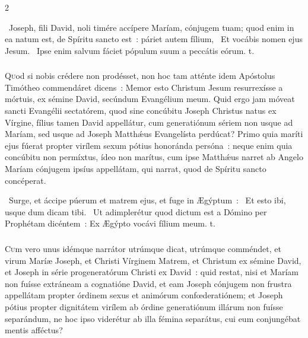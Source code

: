 \documentclass[9pt,twoside]{extarticle}
\begin{document}
\begin{multicols}{2}
{\begin{tightlist}{}
\item {}~Joseph, fili David, noli timére accípere Maríam, cónjugem tuam; quod enim in ea natum est, de Spíritu sancto est~: páriet autem fílium, \textred{*}~Et vocábis nomen ejus Jesum. ~Ipse enim salvum fáciet pópulum suum a peccátis eórum. t.
\end{tightlist}

\subsubsection*{\center {}}
\lettrine{Q}uod si nobis crédere non prodésset, non hoc tam atténte idem Apóstolus Timótheo commendáret dicens~: Memor esto Christum Jesum resurrexísse a mórtuis, ex sémine David, secúndum Evangélium meum. Quid ergo jam móveat sancti Evangélii sectatórem, quod sine concúbitu Joseph Christus natus ex Vírgine, fílius tamen David appellátur, cum generatiónum sériem non usque ad Maríam, sed usque ad Joseph Matthǽus Evangelísta perdúcat? Primo quia maríti ejus fúerat propter virílem sexum pótius honoránda persóna~: neque enim quia concúbitu non permíxtus, ídeo non marítus, cum ipse Matthǽus narret ab Angelo Maríam cónjugem ipsíus appellátam, qui narrat, quod de Spíritu sancto concéperat.

\begin{tightlist}{}
\item {}~Surge, et áccipe púerum et matrem ejus, et fuge in Ægýptum~: \textred{*}~Et esto ibi, usque dum dicam tibi. ~Ut adimplerétur quod dictum est a Dómino per Prophétam dicéntem~: Ex Ægýpto vocávi fílium meum. t.
\end{tightlist}

\subsubsection*{\center {}}
\lettrine{C}um vero unus idémque narrátor utrúmque dicat, utrúmque comméndet, et virum Maríæ Joseph, et Christi Vírginem Matrem, et Christum ex sémine David, et Joseph in série progeneratórum Christi ex David~: quid restat, nisi et Maríam non fuísse extráneam a cognatióne David, et eam Joseph cónjugem non frustra appellátam propter órdinem sexus et animórum confœderatiónem; et Joseph pótius propter dignitátem virílem ab órdine generatiónum illárum non fuísse separándum, ne hoc ipso viderétur ab illa fémina separátus, cui eum conjungébat mentis afféctus?

}
\end{multicols}
\end{document}
